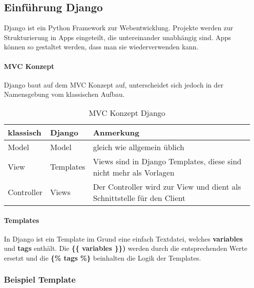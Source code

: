 \subsection{Einführung Django}
Django \cite{django} ist ein Python Framework zur Webentwicklung. Projekte werden zur Strukturierung in Apps eingeteilt, die untereinander unabhängig sind. Apps können so gestaltet werden, dass man sie wiederverwenden kann.
\paragraph{MVC Konzept}
Django baut auf dem MVC Konzept auf, unterscheidet sich jedoch in der Namensgebung vom klassischen Aufbau. 
\medskip
\begin{table}[H]
\centering
    \begin{tabular}{|l|l|l|}
    \hline    
    \rowcolor{lightblue}
	klassisch & Django & Anmerkung \\ \hline
	Model & Model & gleich wie allgemein üblich \\ \hline
	View & Templates & Views sind in Django Templates, diese sind nicht mehr als Vorlagen \\ \hline
	Controller & Views & Der Controller wird zur View und dient als Schnittstelle für den Client \\ \hline
    \end{tabular}
    \caption[MVC Konzept Django]{MVC Konzept Django}
\end{table}

\paragraph{Templates}
In Django ist ein Template im Grund eine einfach Textdatei, welches \textbf{variables} und \textbf{tags} enthält. Die \textbf{\{\{ variables \}\})} werden durch die entsprechenden Werte ersetzt und die \textbf{\{\% tags \%\}} beinhalten die Logik der Templates.

\subsubsection{Beispiel Template}

